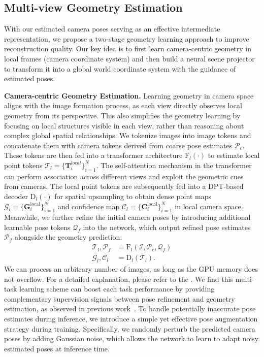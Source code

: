 \subsection{Multi-view Geometry Estimation}\label{method:geometry}
With our estimated camera poses serving as an effective intermediate representation, we propose a two-stage geometry learning approach to improve reconstruction quality. 
Our key idea is to first learn camera-centric geometry in local frames (camera coordinate system) and then build a neural scene projector to transform it into a global world coordinate system with the guidance of estimated poses. 

\noindent\textbf{Camera-centric Geometry Estimation.} 
Learning geometry in camera space aligns with the image formation process, as each view directly observes local geometry from its perspective. This also simplifies the geometry learning by focusing on local structures visible in each view, rather than reasoning about complex global spatial relationships.
%
We tokenize images into image tokens and concatenate them with camera tokens derived from coarse pose estimates $\mathcal{P}_c$. These tokens are then fed into a transformer architecture $\mathrm{F}_l(\cdot)$ to estimate local point tokens $\mathcal{T}_l = \{\mathbf{T}^{local}_{i}\}_{i=1}^{N}$.
%
The self-attention mechanism in the transformer can perform association across different views and exploit the geometric cues from cameras.
%
The local point tokens are subsequently fed into a DPT-based~\cite{ranftl2021vision} decoder $\mathrm{D}_l(\cdot)$ for spatial upsampling to obtain dense point maps $\mathcal{G}_l = \{\mathbf{G}^{\text{local}}_{i}\}_{i=1}^{N}$ and confidence map $\mathcal{C}_l = \{\mathbf{C}^{\text{local}}_{i}\}_{i=1}^{N}$ in local camera space. Meanwhile, we further refine the initial camera poses by introducing additional learnable pose tokens $\mathcal{Q}_{f}$ into the network,  which output refined pose estimates $\mathcal{P}_f$ alongside the geometry prediction:
\begin{align}
\mathcal{T}_{l}, \mathcal{P}_{f} &= \mathrm{F}_l(\mathcal{I}, \mathcal{P}_{c}, \mathcal{Q}_{f}) \\
\mathcal{G}_{l}, \mathcal{C}_{l} &= \mathrm{D}_l(\mathcal{T}_{l}).
\end{align}
We can process an arbitrary number of images, as long as the GPU memory does not overflow. For a detailed explanation, please refer to the \supp.
We find this multi-task learning scheme can boost each task performance by providing complementary supervision signals between pose refinement and geometry estimation, as observed in previous work~\cite{wang2023pf}. To handle potentially inaccurate pose estimates during inference, we introduce a simple yet effective pose augmentation strategy during training. Specifically, we randomly perturb the predicted camera poses by adding Gaussian noise, which allows the network to learn to adapt noisy estimated poses at inference time.

